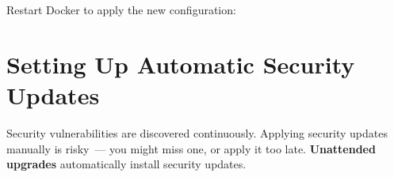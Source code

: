 \noindent{}Restart Docker to apply the new configuration:

\begin{codebox}[short]

\begin{Shaded}
\begin{Highlighting}[]
\end{Highlighting}
\end{Shaded}

\end{codebox}

\setcounter{section}{6}
\section{Setting Up Automatic Security Updates}\label{21-system-setup:217-setting-up-automatic-security-updates}

Security vulnerabilities are discovered continuously. Applying security updates manually is risky~--- you might miss one, or apply it too late. \textbf{Unattended upgrades} automatically install security updates.

